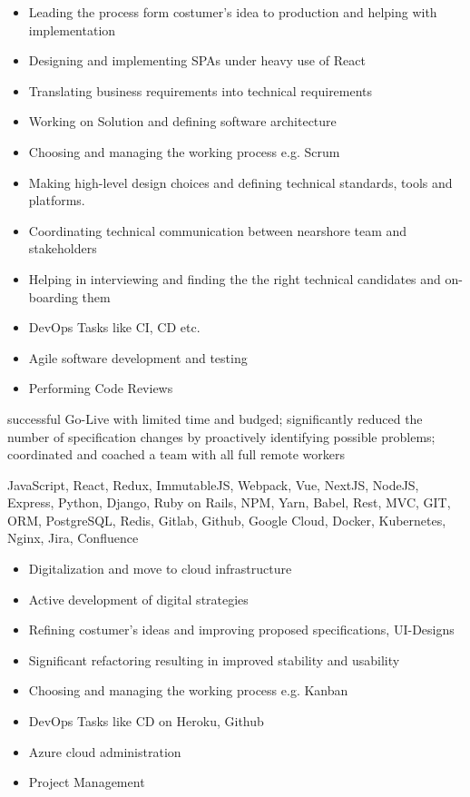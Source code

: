 \documentclass[9pt,a4paper]{altacv}
\begin{document}
\begin{itemize}
\item Leading the process form costumer's idea to production and helping with implementation
\item Designing and implementing SPAs under heavy use of React
\item Translating business requirements into technical requirements
\item Working on Solution and defining software architecture
\item Choosing and managing the working process e.g. Scrum
\item Making high-level design choices and defining technical standards, tools and platforms.
\item Coordinating technical communication between nearshore team and stakeholders
\item Helping in interviewing and finding the the right technical candidates and on-boarding them
\item DevOps Tasks like CI, CD etc.
\item Agile software development and testing
\item Performing Code Reviews
\end{itemize}

successful Go-Live with limited time and budged;
significantly reduced the number of specification changes by proactively identifying possible problems;
coordinated and coached a team with all full remote workers

JavaScript, React, Redux, ImmutableJS, Webpack, Vue, NextJS, NodeJS, Express,
Python, Django, Ruby on Rails, NPM, Yarn, Babel,
Rest, MVC, GIT, ORM, PostgreSQL, Redis,
Gitlab, Github, Google Cloud, Docker, Kubernetes, Nginx,
Jira, Confluence

\divider


%

\begin{itemize}
\item Digitalization and move to cloud infrastructure
\item Active development of digital strategies
\item Refining costumer's ideas and improving proposed specifications, UI-Designs
\item Significant refactoring resulting in improved stability and usability
\item Choosing and managing the working process e.g. Kanban
\item DevOps Tasks like CD on Heroku, Github
\item Azure cloud administration
\item Project Management

\end{itemize}
\end{document}
